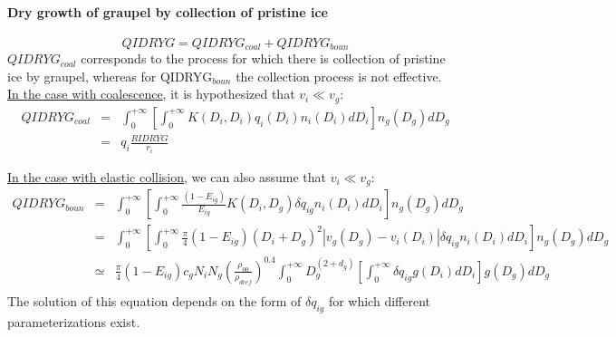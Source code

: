 \paragraph{Dry growth of graupel by collection of pristine ice}

\begin{equation}
  QIDRYG = QIDRYG_{coal} + QIDRYG_{boun}
\end{equation}
$QIDRYG_{coal}$ corresponds to the process for which there is collection of pristine ice by graupel, whereas for QIDRYG$_{boun}$ the collection process is not effective.\\

\noindent
\underline{In the case with coalescence}, it is hypothesized that $v_i \ll v_g$:
\begin{eqnarray}
  QIDRYG_{coal} &=& \int_0 ^{+ \infty} \left[ \int_0 ^{+ \infty}
                    K(D_i , D_i) q_i (D_i) n_i (D_i) dD_i \right]
                    n_g (D_g) dD_g \nonumber \\
                &=& q_i \frac{RIDRYG}{r_i}
\end{eqnarray}

\noindent
\underline{In the case with elastic collision}, we can also assume that $v_i \ll v_g$:
\begin{eqnarray}
  QIDRYG_{boun} &=& \int_0 ^{+ \infty} \left[ \int_0 ^{+ \infty}
                  \frac{(1 - E_{ig})}{E_{ig}} K(D_i , D_g) \delta q_{ig} 
                  n_i (D_i) dD_i \right] n_g (D_g) dD_g \nonumber \\
                &=& \int_0 ^{+ \infty} \left[ \int_0 ^{+ \infty}
                    \frac{\pi}{4} (1 - E_{ig}) (D_i + D_g)^2 
                    |v_g (D_g) - v_i (D_i)| \delta q_{ig} n_i (D_i) dD_i 
                    \right] n_g (D_g) dD_g \nonumber \\
                &\simeq& \frac{\pi}{4} (1 - E_{ig}) c_g N_i N_g
                   \left( \frac{\rho _{00}}{\rho _{dref}} \right)^{0.4}
                   \int_0 ^{+ \infty} D_g ^{(2 + d_g)} 
                   \left[ \int_0 ^{+ \infty} \delta q_{ig} g(D_i) dD_i \right]
                   g(D_g) dD_g \nonumber \\
\end{eqnarray}
The solution of this equation depends on the form of $\delta q_{ig}$ for which different parameterizations exist.

